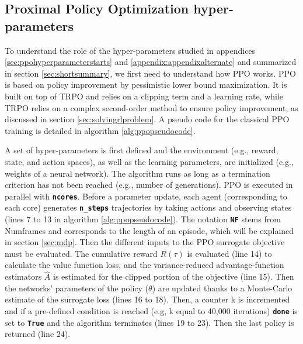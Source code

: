 \documentclass[a4paper]{article}
\newcommand{\code}[1]{\colorbox{light-gray}{\small\color{blue}\textbf{\texttt{#1}}}}
\begin{document}
\subsection{Proximal Policy Optimization hyper-parameters}
\label{sec:ppo_hyperparameters}
To understand the role of the hyper-parameters studied in appendices \ref{sec:ppohyperparameterstarts} and \ref{appendix:appendixalternate} and summarized in section \ref{sec:shortsummary}, we first need to understand how PPO works. PPO \cite{schulman2017proximal} is based on policy improvement by pessimistic lower bound maximization. It is built on top of TRPO and relies on a clipping term and a learning rate, while TRPO relies on a complex second-order method to ensure policy improvement, as discussed in section \ref{sec:solvingrlproblem}. A pseudo code for the classical PPO training is detailed in algorithm \ref{alg:ppopseudocode}.

A set of hyper-parameters is first defined and the environment (e.g., reward, state, and action spaces), as well as the learning parameters, are initialized (e.g., weights of a neural network). The algorithm runs as long as a termination criterion has not been reached (e.g., number of generations). PPO is executed in parallel with \code{ncores}. Before a parameter update, each agent (corresponding to each core) generates \code{n\_steps} trajectories by taking actions and observing states (lines 7 to 13 in algorithm \ref{alg:ppopseudocode}). The notation \code{NF} stems from Numframes and corresponds to the length of an episode, which will be explained in section \ref{sec:mdp}. Then the different inputs to the PPO surrogate objective must be evaluated. The cumulative reward $R(\tau)$ is evaluated (line 14) to calculate the value function loss, and the variance-reduced advantage-function estimators $\hat{A}$ is estimated for the clipped portion of the objective (line 15). Then the networks' parameters of the policy ($\theta$) are updated thanks to a Monte-Carlo estimate of the surrogate loss (lines 16 to 18). Then, a counter k is incremented and if a pre-defined condition is reached (e.g, k equal to 40,000 iterations) \code{done} is set to \code{True} and the algorithm terminates (lines 19 to 23). Then the last policy is returned (line 24). 
\end{document}
